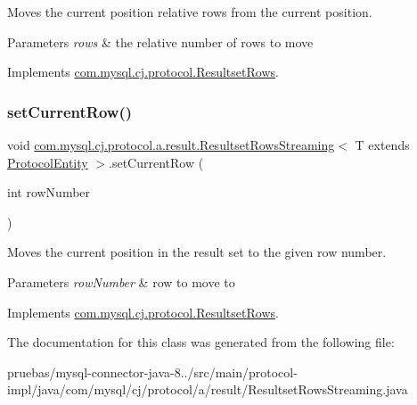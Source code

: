 Moves the current position relative \textquotesingle{}rows\textquotesingle{} from the current position.


\begin{DoxyParams}{Parameters}
{\em rows} & the relative number of rows to move \\
\hline
\end{DoxyParams}


Implements \mbox{\hyperlink{interfacecom_1_1mysql_1_1cj_1_1protocol_1_1_resultset_rows_a81d7635ad38c59a3160e3edc46327bac}{com.\+mysql.\+cj.\+protocol.\+Resultset\+Rows}}.

\mbox{\label{classcom_1_1mysql_1_1cj_1_1protocol_1_1a_1_1result_1_1_resultset_rows_streaming_ac2448082c41dad09ccd418eaf3f400e0}} 
\subsubsection{\texorpdfstring{set\+Current\+Row()}{setCurrentRow()}}
{\footnotesize\ttfamily void \mbox{\hyperlink{classcom_1_1mysql_1_1cj_1_1protocol_1_1a_1_1result_1_1_resultset_rows_streaming}{com.\+mysql.\+cj.\+protocol.\+a.\+result.\+Resultset\+Rows\+Streaming}}$<$ T extends \mbox{\hyperlink{interfacecom_1_1mysql_1_1cj_1_1protocol_1_1_protocol_entity}{Protocol\+Entity}} $>$.set\+Current\+Row (\begin{DoxyParamCaption}\item[{int}]{row\+Number }\end{DoxyParamCaption})}

Moves the current position in the result set to the given row number.


\begin{DoxyParams}{Parameters}
{\em row\+Number} & row to move to \\
\hline
\end{DoxyParams}


Implements \mbox{\hyperlink{interfacecom_1_1mysql_1_1cj_1_1protocol_1_1_resultset_rows_a813efe790e18424a02b692a3f9213446}{com.\+mysql.\+cj.\+protocol.\+Resultset\+Rows}}.



The documentation for this class was generated from the following file\+:\begin{DoxyCompactItemize}
\item 
pruebas/mysql-\/connector-\/java-\/8../src/main/protocol-\/impl/java/com/mysql/cj/protocol/a/result/Resultset\+Rows\+Streaming.\+java\end{DoxyCompactItemize}

